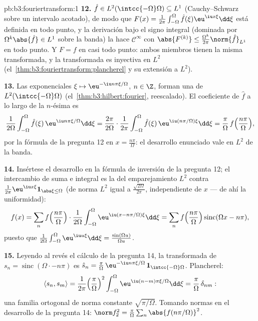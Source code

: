\begin{solution}{pb:b3:fouriertransform:1}
\textbf{12.} $\hat f \in L^2(\intcc{-\Omega}\Omega)
\subseteq L^1$ (Cauchy--Schwarz sobre un intervalo acotado), de modo que
$F(x) = \frac1{2\pi}\int_{-\Omega}^\Omega\hat
f(\xi)\eu^{\iu x\xi}\dd\xi$ está definida en todo punto, y la derivación
bajo el signo integral (dominada por $\Omega^k\abs{\hat f} \in L^1$
sobre la banda) la hace $\mathcal C^\infty$ con $\abs{F^{(k)}} \leq
\frac{\Omega^k}{2\pi}\norm{\hat f}_{L^1}$ en todo punto. Y $F
= f$ en casi todo punto: ambos miembros tienen la misma transformada, y
la transformada es inyectiva en $L^2$
(el~\cref{thm:b3:fouriertransform:plancherel} y su extensión a $L^2$).

\textbf{13.} Las exponenciales $\xi \mapsto \eu^{-\iu
n\pi\xi/\Omega}$, $n \in \Z$, forman una
 de
$L^2(\intcc{-\Omega}\Omega)$
(el~\cref{thm:b3:hilbert:fourier}, reescalado). El coeficiente de
$\hat f$ a lo largo de la $n$-ésima es
\[
\frac1{2\Omega}\int_{-\Omega}^\Omega\hat f(\xi)\,
\eu^{\iu n\pi\xi/\Omega}\dd\xi
= \frac{2\pi}{2\Omega}\cdot
\frac1{2\pi}\int_{-\Omega}^{\Omega}\hat f(\xi)\,
\eu^{\iu(n\pi/\Omega)\xi}\dd\xi
= \frac\pi\Omega\,f\Bigl(\frac{n\pi}\Omega\Bigr),
\]
por la fórmula de la pregunta 12 en $x = \frac{n\pi}\Omega$: el
desarrollo enunciado vale en $L^2$ de la banda.

\textbf{14.} Insértese el desarrollo en la fórmula de inversión de la
pregunta 12; el intercambio de suma e integral es la
 del emparejamiento
$L^2$ contra $\frac1{2\pi}
\eu^{\iu x\xi}\mathbf 1_{\abs\xi\leq\Omega}$ (de norma $L^2$ igual a
$\frac{\sqrt{2\Omega}}{2\pi}$, independiente de $x$ --- de ahí la
uniformidad):
\[
f(x) = \sum_nf\Bigl(\frac{n\pi}\Omega\Bigr)\cdot
\frac1{2\Omega}\int_{-\Omega}^\Omega
\eu^{\iu(x - n\pi/\Omega)\xi}\dd\xi
= \sum_nf\Bigl(\frac{n\pi}\Omega\Bigr)
\operatorname{sinc}(\Omega x - n\pi),
\]
puesto que $\frac1{2\Omega}\int_{-\Omega}^\Omega\eu^{\iu
u\xi}\dd\xi = \frac{\sin(\Omega u)}{\Omega u}$.

\textbf{15.} Leyendo al revés el cálculo de la pregunta 14, la
transformada de $s_n = \operatorname{sinc}(\Omega\cdot -
n\pi)$ es $\hat s_n = \frac\pi\Omega\,\eu^{-\iu
n\pi\xi/\Omega}\,\mathbf 1_{\intcc{-\Omega}\Omega}$. Plancherel:
\[
\langle s_n, s_m\rangle = \frac1{2\pi}
\Bigl(\frac\pi\Omega\Bigr)^2\int_{-\Omega}^\Omega
\eu^{\iu(n-m)\pi\xi/\Omega}\dd\xi =
\frac\pi\Omega\,\delta_{nm} :
\]
una familia ortogonal de norma constante $\sqrt{\pi/\Omega}$. Tomando
normas en el desarrollo de la pregunta 14: $\norm f_2^2 =
\frac\pi\Omega\sum_n\abs{f(n\pi/\Omega)}^2$.


\end{solution}
